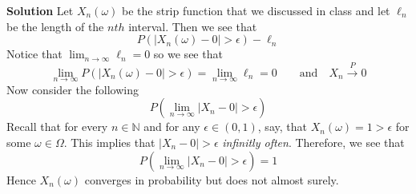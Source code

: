 \documentclass[12pt]{article}  %
\newcommand{\N}{{\mathbb{N}}}
\newcommand{\e}{{\epsilon}}
\begin{document}
\textbf{Solution} Let $X_n(\omega)$ be the strip function that we discussed in class and let $\ell_n$ be the length of the $nth$ interval. Then we see that $$P(|X_n(\omega) - 0|>\e) - \ell_n$$
Notice that $\lim_{n\to\infty}\ell_n = 0$ so we see that $$\lim_{n\to\infty}P(|X_n(\omega)-0|>\e) = \lim_{n\to\infty}\ell_n = 0 \hspace{2em}\text{and}\hspace{1em} X_n\overset{P}{\to}0 $$
Now consider the following $$P(\lim_{n\to\infty}|X_n-0|>\e)$$ Recall that for every $n\in\N$ and for any $\e \in (0,1)$, say, that $X_n(\omega) = 1>\e$ for some $\omega\in\Omega$. This implies that $|X_n - 0|>\e$ \textit{infinitly often}. Therefore, we see that $$P(\lim_{n\to\infty}|X_n - 0|>\e) = 1$$ Hence $X_n(\omega)$ converges in probability but does not almost surely. 
\end{document}
